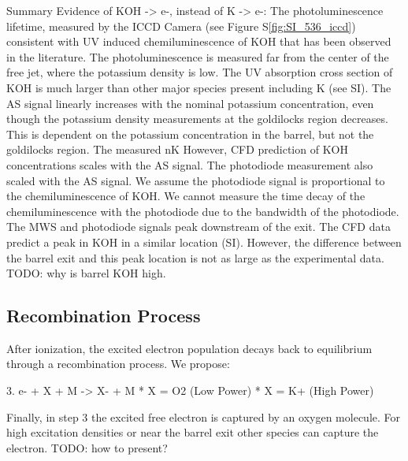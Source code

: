 \begin{outline}
\1 Summary Evidence of KOH -> e-, instead of K -> e-:
    \2 The photoluminescence lifetime, measured by the ICCD Camera (see Figure S\ref*{fig:SI_536_iccd}) consistent with UV induced chemiluminescence of KOH that has been observed in the literature. The photoluminescence is measured far from the center of the free jet, where the potassium density is low.
    \2 The UV absorption cross section of KOH is much larger than other major species present including K (see SI).
    \2 The AS signal linearly increases with the nominal potassium concentration, even though the potassium density measurements at the goldilocks region decreases. This   is dependent on the potassium concentration in the barrel, but not the goldilocks region. The measured nK However, CFD prediction of KOH concentrations scales with the AS signal. The photodiode measurement also scaled with the AS signal. We assume the photodiode signal is proportional to the chemiluminescence of KOH. We cannot measure the time decay of the chemiluminescence with the photodiode due to the bandwidth of the photodiode.
    \2 The MWS and photodiode signals peak downstream of the exit. The CFD data predict a peak in KOH in a similar location (SI). However, the difference between the barrel exit and this peak location is not as large as the experimental data. TODO: why is barrel KOH high. 
\end{outline}

\subsection{Recombination Process}


After ionization, the excited electron population decays back to equilibrium through a recombination process. We propose: 

3. e- + X + M -> X- + M
    * X = O2 (Low Power) 
    * X = K+ (High Power)

Finally, in step 3 the excited free electron is captured by an oxygen molecule. For high excitation densities or near the barrel exit other species can capture the electron. TODO: how to present? 

